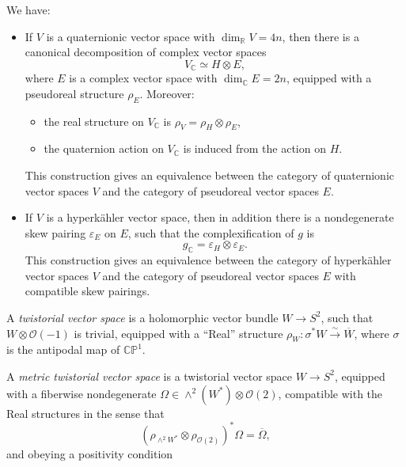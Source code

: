 \documentclass[12pt,letterpaper,reqno]{article}
\numberwithin{equation}{section}
\newcommand{\cO}{\ensuremath{\mathcal O}}
\newcommand{\R}{\ensuremath{\mathbb R}}
\newcommand{\C}{\ensuremath{\mathbb C}}
\newcommand{\PP}{\ensuremath{\mathbb P}}
\newcommand{\hk}{hyperk\"ahler\xspace}
\newcommand{\simarrow}{\xrightarrow\sim}
\newcommand{\ti}[1]{\textit{#1}}
\newcommand{\fixme}[1]{{\color{orange}{[#1]}}}
\begin{document}
\begin{prop}
We have:
\begin{itemize}
\item If $V$ is a quaternionic vector space with $\dim_\R V = 4n$, then 
there is a canonical decomposition of complex vector spaces
\begin{equation}
  V_\C \simeq H \otimes E,
\end{equation}
where $E$ is a complex vector space with $\dim_\C E = 2n$,
equipped with a pseudoreal structure $\rho_E$. Moreover:
\begin{itemize}
  \item the real structure on $V_\C$ is $\rho_V = \rho_H \otimes \rho_E$,
  \item the quaternion action on $V_\C$ is induced from the action on $H$.
\end{itemize}
This construction gives an equivalence between the category of
quaternionic vector spaces $V$ and the category of pseudoreal 
vector spaces $E$.

\item If $V$ is a \hk vector space, then in addition there is
a nondegenerate skew pairing $\varepsilon_E$ on $E$, such 
that the complexification of $g$ is
\begin{equation} 
 g_\C = \varepsilon_H \otimes \varepsilon_E.
\end{equation}
This construction gives an equivalence between the category
of \hk vector spaces $V$ and the category of pseudoreal vector spaces $E$
with compatible skew pairings.
\end{itemize}
\end{prop}

\begin{pf} \fixme{...}
\end{pf}

\begin{defn} A \ti{twistorial vector space}
is a holomorphic vector bundle $W \to S^2$, such that
$W \otimes \cO(-1)$ is trivial, equipped with
a ``Real'' structure $\rho_W: \sigma^* W \simarrow \overline{W}$, where
$\sigma$ is the antipodal map of $\C\PP^1$.
\end{defn}

\begin{defn} A \ti{metric twistorial
vector space} is a twistorial vector space $W \to S^2$, equipped with
a fiberwise nondegenerate $\Omega \in \wedge^2(W^*) \otimes \cO(2)$,
compatible with the Real structures in the sense that
\begin{equation}
  (\rho_{\wedge^2 W^*} \otimes \rho_{\cO(2)})^*\Omega = \overline\Omega,
\end{equation}
and obeying a positivity condition \fixme{...}
\end{defn}
\end{document}

